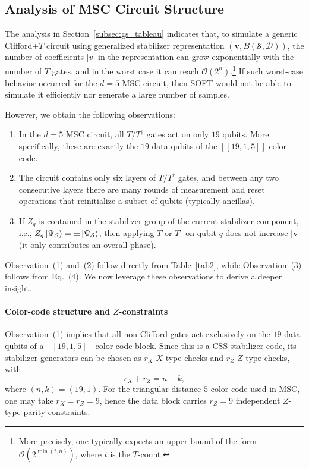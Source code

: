 \documentclass[10pt,conference]{IEEEtran}
\begin{document}
\subsection{Analysis of MSC Circuit Structure}
The analysis in Section~\ref{subsec:gs_tableau} indicates that, to simulate a generic Clifford+$T$ circuit using generalized stabilizer representation $(\mathbf{v},B(\mathcal{S},\mathcal{D}))$, the number of coefficients $|v|$ in the representation can grow exponentially with the number of $T$ gates, and in the worst case it can reach $\mathcal{O}(2^n)$.\footnote{More precisely, one typically expects an upper bound of the form $\mathcal{O}(2^{\min(t,n)})$, where $t$ is the $T$-count.} If such worst-case behavior occurred for the $d=5$ MSC circuit, then \textsc{SOFT} would not be able to simulate it efficiently nor generate a large number of samples.

However, we obtain the following observations:

\begin{enumerate}
    \item In the $d=5$ MSC circuit, all $T/T^\dagger$ gates act on only $19$ qubits. More specifically, these are exactly the $19$ data qubits of the $[[19,1,5]]$ color code.
    \item The circuit contains only six layers of $T/T^\dagger$ gates, and between any two consecutive layers there are many rounds of measurement and reset operations that reinitialize a subset of qubits (typically ancillas).
    \item If $Z_q$ is contained in the stabilizer group of the current stabilizer component, i.e.,
    $Z_q\ket{\Psi_\mathcal{S}}=\pm\ket{\Psi_\mathcal{S}}$,
    then applying $T$ or $T^\dagger$ on qubit $q$ does not increase $|\mathbf{v}|$ (it only contributes an overall phase). 
\end{enumerate}

Observation~(1) and~(2) follow directly from Table~\ref{tab2}, while Observation~(3) follows from Eq.~(4).
We now leverage these observations to derive a deeper insight.

\paragraph{Color-code structure and $Z$-constraints}
Observation~(1) implies that all non-Clifford gates act exclusively on the $19$ data qubits of a $[[19,1,5]]$ color code block.
Since this is a CSS stabilizer code, its stabilizer generators can be chosen as $r_X$ $X$-type checks and $r_Z$ $Z$-type checks, with
\begin{equation}
r_X + r_Z = n - k,
\end{equation}
where $(n,k)=(19,1)$. For the triangular distance-$5$ color code used in MSC, one may take $r_X=r_Z=9$, hence the data block carries $r_Z=9$ independent $Z$-type parity constraints.
\end{document}
